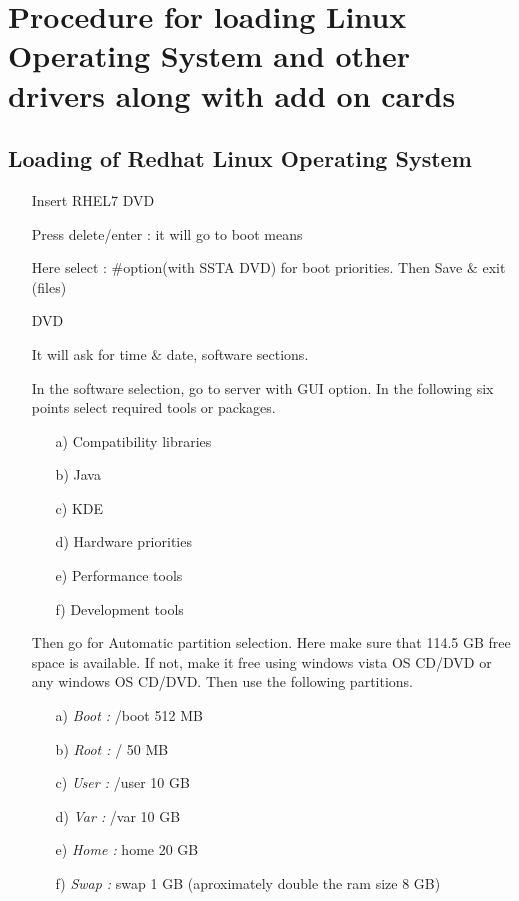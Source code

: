 \chapter{Procedure for loading Linux Operating System and other drivers along with add on cards}
\label{Chapter6}

\section{Loading of Redhat Linux Operating System} 

\begin{enumerate}
	\item [\textbullet] Insert RHEL7 DVD
	\item [\textbullet] Press delete/enter : it will go to boot means
	\item [\textbullet] Here select : $\#$option(with SSTA DVD) for boot priorities. Then Save $\&$ exit (files)
	\item [\textbullet] DVD
	\item [\textbullet] It will ask for time $\&$ date, software sections.
	\item [\textbullet] In the software selection, go to server with GUI option. In the following six points select required tools or packages.
		\begin{enumerate}
			\item [a)] Compatibility libraries
			\item [b)] Java
			\item [c)] KDE
			\item [d)] Hardware priorities
			\item [e)] Performance tools
			\item [f)] Development tools
		\end{enumerate}
	\item [\textbullet] Then go for Automatic partition selection. Here make sure that 114.5 GB free space is available. If not, make it free using windows vista OS CD/DVD or any windows OS CD/DVD. Then use the following partitions.
		\begin{enumerate}
			\item [a)] \textit{Boot :} /boot 512 MB
			\item [b)] \textit{Root :} / 50 MB
			\item [c)] \textit{User :} /user 10 GB
			\item [d)] \textit{Var :} /var 10 GB
			\item [e)] \textit{Home :} home 20 GB
			\item [f)] \textit{Swap :} swap 1 GB (aproximately double the ram size 8 GB)

\end{enumerate}
\end{enumerate}
